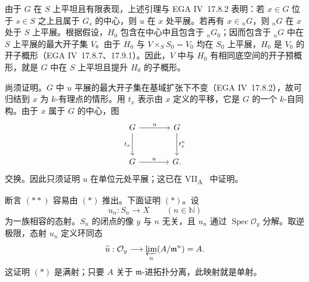 
由于 \(G\) 在 \(S\) 上平坦且有限表现，上述引理与 EGA IV~17.8.2 表明：若 \(x\in G\) 位于 \(s\in S\) 之上且属于 \(G_s\) 的中心，则 \(u\) 在 \(x\) 处平展。若再有 \(x\in {}_nG\)，则 \({}_nG\) 在 \(x\) 处于 \(S\) 上平展。根据假设，\(H_0\) 包含在中心中且包含于 \({}_nG_0\)；因而包含于 \({}_nG\) 中在 \(S\) 上平展的最大开子集 \(V\)。由于 \(H_0\) 与 \(V\times_S S_0=V_0\) 均在 \(S_0\) 上平展，\(H_0\) 是 \(V_0\) 的开子概形（EGA IV~17.8.7、17.9.1）。因此，\(V\) 中与 \(H_0\) 有相同底空间的开子预概形，就是 \(G\) 中在 \(S\) 上平坦且提升 \(H_0\) 的子概形。

尚须证明。\(G\) 中 \(u\) 平展的最大开子集在基域扩张下不变（EGA IV~17.8.2），故可归结到 \(x\) 为 \(k\)-有理点的情形。用 \(t_x\) 表示由 \(x\) 定义的平移，它是 \(G\) 的一个 \(k\)-自同构。由于 \(x\) 属于 \(G\) 的中心，图
\[
\begin{tikzcd}[column sep=large,row sep=large]
G \arrow[r,"u"] \arrow[d,"t_x"'] & G \arrow[d,"t_x^n"] \\
G \arrow[r,"u"] & G .
\end{tikzcd}
\]
交换。因此只须证明 \(u\) 在单位元处平展；这已在 VII\textsubscript{A}~ 中证明。



断言 \((\ast\ast)\) 容易由 \((\ast)\) 推出。下面证明 \((\ast)\)。设
\[
  u_n:S_n\longrightarrow X\qquad(n\in\mathbb N)
\]
为一族相容的态射。\(S_n\) 的闭点的像 \(y\) 与 \(n\) 无关，且 \(u_n\) 通过 \(\operatorname{Spec}\mathcal O_y\) 分解。取逆极限，态射 \(u_n\) 定义环同态
\[
  \widetilde u:\mathcal O_y
  \longrightarrow
  \varprojlim_n(A/\mathfrak m^n)=A.
\]
这证明 \((\ast)\) 是满射；只要 \(A\) 关于 \(\mathfrak m\)-进拓扑分离，此映射就是单射。

